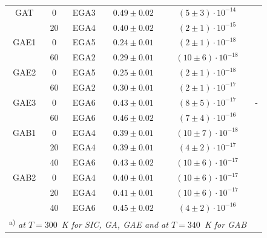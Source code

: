 \documentclass[final,3p,times,twocolumn,authoryear]{elsarticle}
\begin{document}
\begin{table}
\begin{tabular}{ccccccc}
GAT& 0 &EGA3& $0.49\pm0.02$ &$(5\pm3)\cdot10^{-14}$&\multicolumn{2}{c}{}\\ %
& 20 &EGA4& $0.40\pm0.02$ &$(2\pm1)\cdot10^{-15}$&\multicolumn{2}{c}{}\\ %
GAE1& 0 &EGA5& $0.24\pm0.01$ &$(2\pm1)\cdot10^{-18}$&\multicolumn{2}{c}{}\\ %
& 60 &EGA2& $0.29\pm0.01$ &$(10\pm6)\cdot10^{-18}$&\multicolumn{2}{c}{}\\ %
GAE2& 0 &EGA5& $0.25\pm0.01$ &$(2\pm1)\cdot10^{-18}$&\multicolumn{2}{c}{}\\ %
& 60 &EGA2& $0.30\pm0.01$ &$(2\pm1)\cdot10^{-17}$&\multicolumn{2}{c}{}\\ %
GAE3& 0 &EGA6& $0.43\pm0.01$ &$(8\pm5)\cdot10^{-17}$&\multicolumn{2}{c}{-}\\ %
& 60 &EGA6& $0.46\pm0.02$ &$(7\pm4)\cdot10^{-16}$&\multicolumn{2}{c}{}\\ %
GAB1& 0 &EGA4& $0.39\pm0.01$ &$(10\pm7)\cdot10^{-18}$&\multicolumn{2}{c}{}\\ %
& 20 &EGA4& $0.39\pm0.01$ &$(4\pm2)\cdot10^{-17}$&\multicolumn{2}{c}{}\\ %
& 40 &EGA6& $0.43\pm0.02$ &$(10\pm6)\cdot10^{-17}$&\multicolumn{2}{c}{}\\ %
GAB2& 0 &EGA4& $0.40\pm0.01$ &$(10\pm6)\cdot10^{-17}$&\multicolumn{2}{c}{}\\ %
& 20 &EGA4& $0.41\pm0.01$ &$(10\pm6)\cdot10^{-17}$&\multicolumn{2}{c}{}\\ %
& 40 &EGA6& $0.45\pm0.02$ &$(4\pm2)\cdot10^{-16}$&\multicolumn{2}{c}{}\\  %
\multicolumn{6}{l}{\textsuperscript{ a)} \emph{at $T=300$~K for SIC, GA, GAE and at $T=340$~K for GAB}}\\
\hline
\end{tabular}
\end{table}

 \cite{Pavlovic2000}

\cite{Bulyarskii2000,Makram}

\cite{Stellmacher}

\cite{Bourgoin2001}

\cite{Bourgoin2001}

\cite{Bourgoin:GaAs}

\cite{Pavlovic2000}
\end{document}
